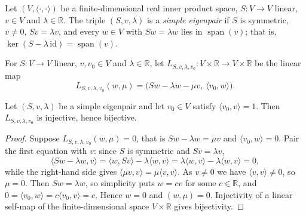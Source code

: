 \begin{definition}
\label{def:simple-eigenpair}
\leanok
Let $(V,\langle\cdot,\cdot\rangle)$ be a finite-dimensional real inner product space, $S : V \to V$ linear, $v \in V$ and $\lambda \in \mathbb{R}$. The triple $(S,v,\lambda)$ is a \emph{simple eigenpair} if $S$ is symmetric, $v \neq 0$, $Sv = \lambda v$, and every $w \in V$ with $Sw = \lambda w$ lies in $\operatorname{span}(v)$; that is, $\ker(S - \lambda\,\mathrm{id}) = \operatorname{span}(v)$.
\end{definition}

\begin{definition}
\label{def:eigen-linearisation}
\leanok
For $S : V \to V$ linear, $v, v_0 \in V$ and $\lambda \in \mathbb{R}$, let $L_{S,v,\lambda,v_0} : V \times \mathbb{R} \to V \times \mathbb{R}$ be the linear map
\[
  L_{S,v,\lambda,v_0}(w,\mu) = \bigl(Sw - \lambda w - \mu v,\ \langle v_0, w\rangle\bigr).
\]
\end{definition}

\begin{lemma}
\label{lem:eigen-linearisation-injective}
\leanok
{}
Let $(S,v,\lambda)$ be a simple eigenpair and let $v_0 \in V$ satisfy $\langle v_0, v\rangle = 1$. Then $L_{S,v,\lambda,v_0}$ is injective, hence bijective.
\end{lemma}

\begin{proof}
\leanok
{}
Suppose $L_{S,v,\lambda,v_0}(w,\mu) = 0$, that is $Sw - \lambda w = \mu v$ and $\langle v_0, w\rangle = 0$. Pair the first equation with $v$: since $S$ is symmetric and $Sv = \lambda v$,
\[
  \langle Sw - \lambda w, v\rangle = \langle w, Sv\rangle - \lambda\langle w, v\rangle = \lambda\langle w,v\rangle - \lambda\langle w,v\rangle = 0 ,
\]
while the right-hand side gives $\langle \mu v, v\rangle = \mu\langle v,v\rangle$. As $v \neq 0$ we have $\langle v,v\rangle \neq 0$, so $\mu = 0$. Then $Sw = \lambda w$, so simplicity puts $w = cv$ for some $c \in \mathbb{R}$, and $0 = \langle v_0, w\rangle = c\langle v_0, v\rangle = c$. Hence $w = 0$ and $(w,\mu) = 0$. Injectivity of a linear self-map of the finite-dimensional space $V \times \mathbb{R}$ gives bijectivity.
\end{proof}


